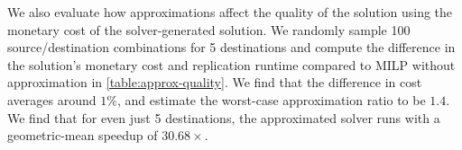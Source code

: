 We also evaluate how approximations affect the quality of the solution using the monetary cost of the solver-generated solution. We randomly sample 100 source/destination combinations for 5 destinations and compute the difference in the solution's monetary cost and replication runtime compared to MILP without approximation in \cref{table:approx-quality}. We find that the difference in cost averages around $1\%$, and estimate the worst-case approximation ratio to be $1.4$. We find that for even just 5 destinations, the approximated solver runs with a geometric-mean speedup of $30.68\times$. %


